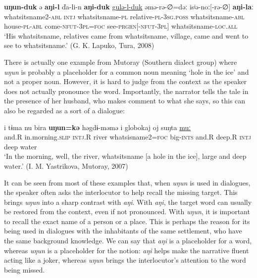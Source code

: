 \documentclass[output=paper,colorlinks,citecolor=brown]{langscibook}
\begin{document}
\ea
    \label{example6.38}
    \gll \textbf{uŋun-duk}	ə	\textbf{aŋi-l}	ďa-li-n \textbf{aŋi-duk}	\uline{gulə-l-duk}	əmə-rə-∅=dəː    isʲə-noː[-rə-∅]	\textbf{aŋi-laː}\\
    whatsitsname2-\textsc{abl}	\textsc{intj}	whatsitsname-\textsc{pl}	relative-\textsc{pl}-\textsc{3sg.poss}   whatsitsname-\textsc{abl}	house-\textsc{pl}-\textsc{abl}	come-\textsc{nfut}-3\textsc{pl}=\textsc{foc}   see-\textsc{prgrn}[-\textsc{nfut}-3\textsc{pl}]	whatsitsname-\textsc{loc.all}\\
    \glt `His whatsitsname, relatives came from whatsitsname, village, came and went to see to whatsitsname.' (G. K. Lapuko, Tura, 2008)\\
    \z

There is actually one example from Mutoray (Southern dialect group) where \textit{uŋun} is probably a placeholder for a common noun meaning ‘hole in the ice’ and not a proper noun. However, it is hard to judge from the context as the speaker does not actually pronounce the word. Importantly, the narrator tells the tale in the presence of her husband, who makes comment to what she says, so this can also be regarded as a sort of a dialogue:

\ea
    \label{example6.39}
    \gll i	tɨma	nu	bira	\textbf{uŋun=kə}	həgdɨ-məmə  i	globokaj	oj	suŋta	\uline{muː}\\
    and.R	in.morning.\textsc{slip}	\textsc{intj}.R	river	whatsisname2=\textsc{foc}	big-\textsc{ints}    and.R	deep.R	\textsc{intj}	deep	water	\\
    \glt `In the morning, well, the river, whatsitsname [a hole in the ice], large and deep water.' (I. M. Yastrikova, Mutoray, 2007)\\
    \z

It can be seen from most of these examples that, when \textit{uŋun} is used in dialogues, the speaker often asks the interlocutor to help recall the missing target. This brings \textit{uŋun} into a sharp contrast with \textit{aŋi}. With \textit{aŋi}, the target word can usually be restored from the context, even if not pronounced. With \textit{uŋun}, it is important to recall the exact name of a person or a place. This is perhaps the reason for its being used in dialogues with the inhabitants of the same settlement, who have the same background knowledge. We can say that \textit{aŋi} is a placeholder for a word, whereas \textit{uŋun} is a placeholder for the notion: \textit{aŋi} helps make the narrative fluent acting like a joker, whereas \textit{uŋun} brings the interlocutor’s attention to the word being missed.
\end{document}
